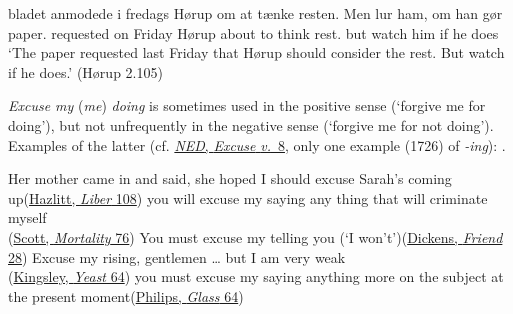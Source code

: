 \ex
\gll bladet anmodede i fredags Hørup om at tænke resten. Men lur ham, om han gør\\
paper.\DEF{} requested on Friday Hørup about to think rest.\DEF{} but watch him if he does\\
\glt `The paper requested last Friday that Hørup should consider the rest. But watch if he does.'
\hfill(Hørup 2.105) %

\z
\z
{}

 \label{sec:excuse}

\textit{Excuse my} (\textit{me})\textit{ doing} is sometimes used in the positive sense (`forgive me for doing'), but not unfrequently in the negative sense (`forgive me for not doing'). Examples of the latter (cf. \href{https://archive.org/details/oed03arch/page/n1147/mode/2up?view=theater}{\textit{NED}, \textit{Excuse} \textit{v.}~8}, only one example (1726) of \textit{-ing}): .

\ea \label{ex:04-126}
\ea
Her mother came in and said, she hoped I should excuse Sarah's coming up\hfill(\href{https://archive.org/details/liberamorisornew00hazlrich/page/108/mode/2up?q=\%22her+mother+came+in+and+said\%22&view=theater}{Hazlitt, \textit{Liber} 108})
\ex
you will excuse my saying any thing that will criminate myself\\\hfill(\href{https://archive.org/details/talesmylandlord09scotgoog/page/n198/mode/2up?q=\%22criminate\%22&view=theater}{Scott, \textit{Mortality} 76}) %
\ex
You must excuse my telling you  \phantom{x} (`I won't')\hfill(\href{https://archive.org/details/ourmutualfriendc0000char/page/20/mode/2up?q=\%22excuse+my+telling+you\%22&view=theater}{Dickens, \textit{Friend} 28})
\ex
Excuse my rising, gentlemen {\dots} but I am very weak\\\hfill(\href{https://archive.org/details/yeastaproblem01kinggoog/page/n113/mode/2up?q=\%22excuse+my+rising+gentlemen\%22&view=theater}{Kingsley, \textit{Yeast} 64})
\ex
you must excuse my saying anything more on the subject at the present moment\hfill(\href{https://archive.org/details/24180134.2382.emory.edu/page/n69/mode/2up?q=\%22you+must+excuse+my+saying+anything\%22&view=theater}{Philips, \textit{Glass} 64})
\z
\z
{}

